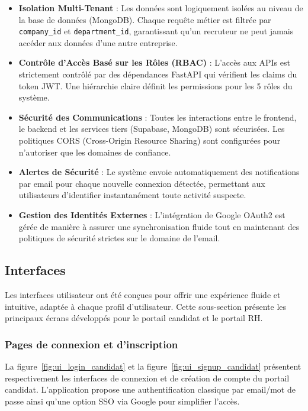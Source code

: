 \begin{itemize}
    \item \textbf{Isolation Multi-Tenant} : Les données sont logiquement isolées au niveau de la base de données (MongoDB). Chaque requête métier est filtrée par \texttt{company\_id} et \texttt{department\_id}, garantissant qu'un recruteur ne peut jamais accéder aux données d'une autre entreprise.
    \item \textbf{Contrôle d'Accès Basé sur les Rôles (RBAC)} : L'accès aux APIs est strictement contrôlé par des dépendances FastAPI qui vérifient les claims du token JWT. Une hiérarchie claire définit les permissions pour les 5 rôles du système.
    \item \textbf{Sécurité des Communications} : Toutes les interactions entre le frontend, le backend et les services tiers (Supabase, MongoDB) sont sécurisées. Les politiques CORS (Cross-Origin Resource Sharing) sont configurées pour n'autoriser que les domaines de confiance.
    \item \textbf{Alertes de Sécurité} : Le système envoie automatiquement des notifications par email pour chaque nouvelle connexion détectée, permettant aux utilisateurs d'identifier instantanément toute activité suspecte.
    \item \textbf{Gestion des Identités Externes} : L'intégration de Google OAuth2 est gérée de manière à assurer une synchronisation fluide tout en maintenant des politiques de sécurité strictes sur le domaine de l'email.
\end{itemize}

\subsection{Interfaces}
Les interfaces utilisateur ont été conçues pour offrir une expérience fluide et intuitive, adaptée à chaque profil d'utilisateur. Cette sous-section présente les principaux écrans développés pour le portail candidat et le portail RH.

\subsubsection{Pages de connexion et d'inscription}
La figure~\ref{fig:ui_login_candidat} et la figure~\ref{fig:ui_signup_candidat} présentent respectivement les interfaces de connexion et de création de compte du portail candidat. L'application propose une authentification classique par email/mot de passe ainsi qu'une option SSO via Google pour simplifier l'accès.

